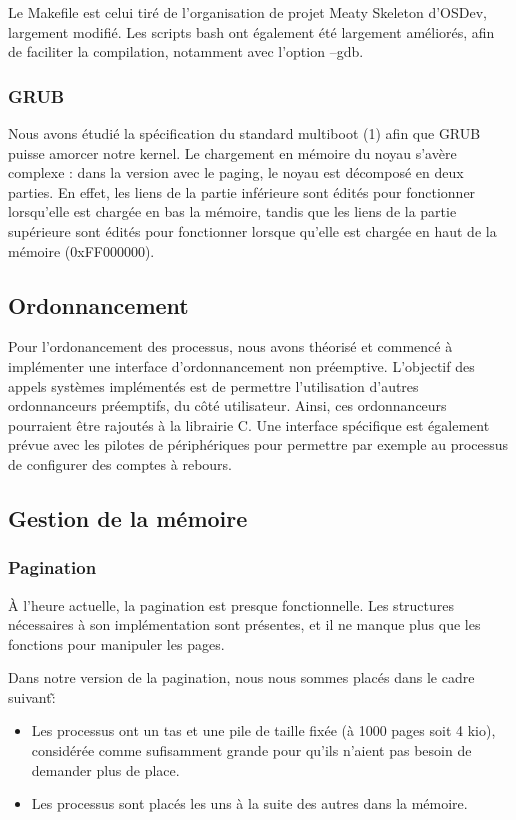 \documentclass[a4paper, 11pt, twoside]{article}
\begin{document}
Le Makefile est celui tiré de l'organisation de projet Meaty Skeleton d'OSDev,
largement modifié.
Les scripts bash ont également été largement améliorés, afin de faciliter la 
compilation, notamment avec l'option --gdb.

\subsubsection{GRUB}

Nous avons étudié la spécification du standard multiboot (1) afin que GRUB puisse
amorcer notre kernel. Le chargement en mémoire du noyau s'avère complexe : dans la
 version avec le paging, le noyau est décomposé en deux parties. En effet, les liens
 de la partie inférieure sont édités pour fonctionner lorsqu'elle est chargée en bas 
 la mémoire, tandis que les liens de la partie supérieure sont édités pour fonctionner
 lorsque qu'elle est chargée en haut de la mémoire (0xFF000000).

\subsection{Ordonnancement}

Pour l'ordonancement des processus, nous avons théorisé et commencé à
implémenter une interface d'ordonnancement non préemptive. L'objectif des appels
systèmes implémentés est de permettre l'utilisation d'autres ordonnanceurs
préemptifs, du côté utilisateur. Ainsi, ces ordonnanceurs pourraient être
rajoutés à la librairie C.
Une interface spécifique est également prévue avec les pilotes de périphériques
pour permettre par exemple au processus de configurer des comptes à rebours.

\subsection{Gestion de la mémoire}

\subsubsection{Pagination}

À l'heure actuelle, la pagination est presque fonctionnelle. Les structures
nécessaires à son implémentation sont présentes, et il ne manque plus que les
fonctions pour manipuler les pages.

Dans notre version de la pagination, nous nous sommes placés dans le cadre
suivant\~:
\begin{itemize}
  \item Les processus ont un tas et une pile de taille fixée (à 1000 pages soit
    4 kio), considérée comme sufisamment grande pour qu'ils n'aient pas besoin
    de demander plus de place.
  \item Les processus sont placés les uns à la suite des autres dans la mémoire.
\end{itemize}
\end{document}
